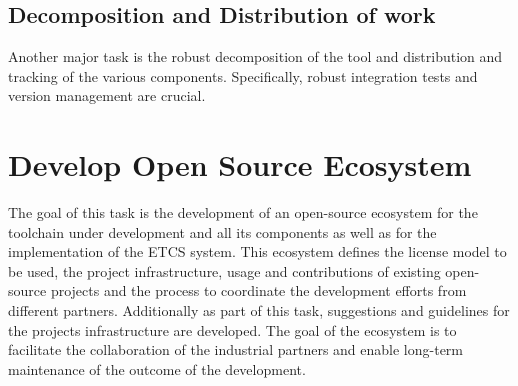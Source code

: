 \documentclass[11pt, a4paper]{article}
\begin{document}
\subsection{Decomposition and Distribution of work}

Another major task is the robust decomposition of the tool and distribution and tracking of the various components.  Specifically, robust integration tests and version management are crucial.

\section{Develop Open Source Ecosystem}
The goal of this task is the development of an open-source ecosystem for the toolchain under development and all its components as well as for the implementation of the ETCS system. This ecosystem defines the license model to be used, the project infrastructure, usage and contributions of existing open-source projects and the process to coordinate the development efforts from different partners. Additionally as part of this task, suggestions and guidelines for the projects infrastructure are developed. The goal of the ecosystem is to facilitate the collaboration of the industrial partners and enable long-term maintenance of the outcome of the development.
\end{document}
